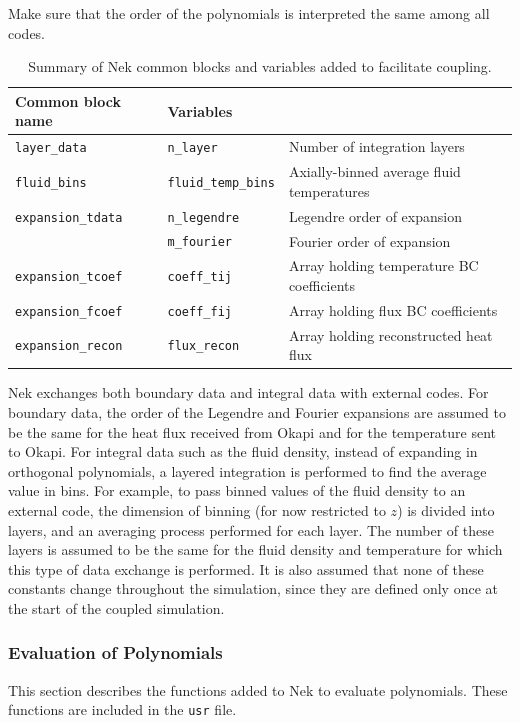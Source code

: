 \documentclass[10pt]{article}
\numberwithin{equation}{section} %
\begin{document}
\color{magenta}
Make sure that the order of the polynomials is interpreted the same among all codes.
\color{black}

\begin{table}[H]
\caption{Summary of Nek common blocks and variables added to facilitate coupling.}
\centering
\begin{tabular}{l l l}
\hline\hline
Common block name & Variables & \\ [0.5ex]
\hline
{\tt layer\_data} & {\tt n\_layer} & Number of integration layers\\
{\tt fluid\_bins} & {\tt fluid\_temp\_bins} & Axially-binned average fluid temperatures\\
{\tt expansion\_tdata} & {\tt n\_legendre} & Legendre order of expansion\\
& {\tt m\_fourier} & Fourier order of expansion\\
{\tt expansion\_tcoef} & {\tt coeff\_tij} & Array holding temperature BC coefficients\\
{\tt expansion\_fcoef} & {\tt coeff\_fij} & Array holding flux BC coefficients\\
{\tt expansion\_recon} & {\tt flux\_recon} & Array holding reconstructed heat flux\\
\hline
\end{tabular}
\label{table:NekCommon}
\end{table}

Nek exchanges both boundary data and integral data with external codes. For boundary data, the order of the Legendre and Fourier expansions are assumed to be the same for the heat flux received from Okapi and for the temperature sent to Okapi. For integral data such as the fluid density, instead of expanding in orthogonal polynomials, a layered integration is performed to find the average value in bins. For example, to pass binned values of the fluid density to an external code, the dimension of binning (for now restricted to \(z\)) is divided into layers, and an averaging process performed for each layer. The number of these layers is assumed to be the same for the fluid density and temperature for which this type of data exchange is performed. It is also assumed that none of these constants change throughout the simulation, since they are defined only once at the start of the coupled simulation.

\subsubsection{Evaluation of Polynomials}
This section describes the functions added to Nek to evaluate polynomials. These functions are included in the {\tt usr} file.
\end{document}
